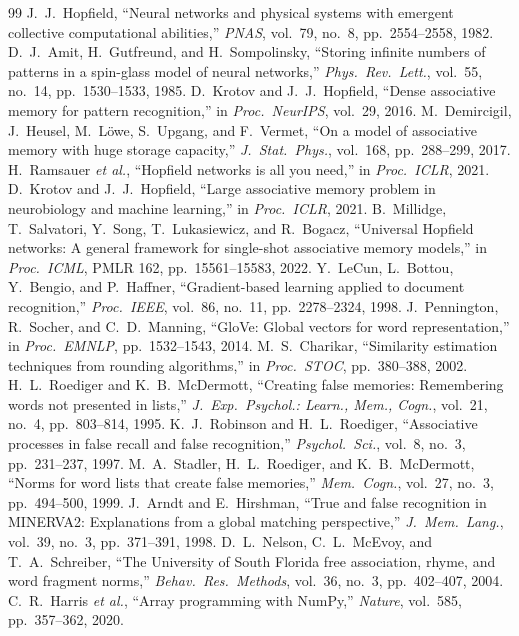\documentclass[conference]{IEEEtran}
\begin{document}
\begin{thebibliography}{99}
\footnotesize
{} J.~J.~Hopfield, ``Neural networks and physical systems with emergent collective computational abilities,'' \emph{PNAS}, vol.~79, no.~8, pp.~2554--2558, 1982.
 D.~J.~Amit, H.~Gutfreund, and H.~Sompolinsky, ``Storing infinite numbers of patterns in a spin-glass model of neural networks,'' \emph{Phys.\ Rev.\ Lett.}, vol.~55, no.~14, pp.~1530--1533, 1985.
 D.~Krotov and J.~J.~Hopfield, ``Dense associative memory for pattern recognition,'' in \emph{Proc.\ NeurIPS}, vol.~29, 2016.
 M.~Demircigil, J.~Heusel, M.~L\"owe, S.~Upgang, and F.~Vermet, ``On a model of associative memory with huge storage capacity,'' \emph{J.\ Stat.\ Phys.}, vol.~168, pp.~288--299, 2017.
 H.~Ramsauer \emph{et al.}, ``Hopfield networks is all you need,'' in \emph{Proc.\ ICLR}, 2021.
 D.~Krotov and J.~J.~Hopfield, ``Large associative memory problem in neurobiology and machine learning,'' in \emph{Proc.\ ICLR}, 2021.
 B.~Millidge, T.~Salvatori, Y.~Song, T.~Lukasiewicz, and R.~Bogacz, ``Universal Hopfield networks: A general framework for single-shot associative memory models,'' in \emph{Proc.\ ICML}, PMLR 162, pp.~15561--15583, 2022.
 Y.~LeCun, L.~Bottou, Y.~Bengio, and P.~Haffner, ``Gradient-based learning applied to document recognition,'' \emph{Proc.\ IEEE}, vol.~86, no.~11, pp.~2278--2324, 1998.
 J.~Pennington, R.~Socher, and C.~D.~Manning, ``GloVe: Global vectors for word representation,'' in \emph{Proc.\ EMNLP}, pp.~1532--1543, 2014.
 M.~S.~Charikar, ``Similarity estimation techniques from rounding algorithms,'' in \emph{Proc.\ STOC}, pp.~380--388, 2002.
 H.~L.~Roediger and K.~B.~McDermott, ``Creating false memories: Remembering words not presented in lists,'' \emph{J.\ Exp.\ Psychol.: Learn., Mem., Cogn.}, vol.~21, no.~4, pp.~803--814, 1995.
 K.~J.~Robinson and H.~L.~Roediger, ``Associative processes in false recall and false recognition,'' \emph{Psychol.\ Sci.}, vol.~8, no.~3, pp.~231--237, 1997.
 M.~A.~Stadler, H.~L.~Roediger, and K.~B.~McDermott, ``Norms for word lists that create false memories,'' \emph{Mem.\ Cogn.}, vol.~27, no.~3, pp.~494--500, 1999.
 J.~Arndt and E.~Hirshman, ``True and false recognition in MINERVA2: Explanations from a global matching perspective,'' \emph{J.\ Mem.\ Lang.}, vol.~39, no.~3, pp.~371--391, 1998.
 D.~L.~Nelson, C.~L.~McEvoy, and T.~A.~Schreiber, ``The University of South Florida free association, rhyme, and word fragment norms,'' \emph{Behav.\ Res.\ Methods}, vol.~36, no.~3, pp.~402--407, 2004.
 C.~R.~Harris \emph{et al.}, ``Array programming with NumPy,'' \emph{Nature}, vol.~585, pp.~357--362, 2020.
\end{thebibliography}
\end{document}
